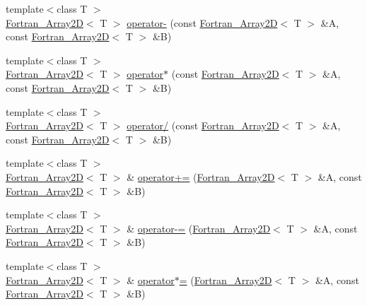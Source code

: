 \begin{DoxyCompactItemize}
{\footnotesize template$<$class T $>$ }\\\hyperlink{classTNT_1_1Fortran__Array2D}{Fortran\+\_\+\+Array2D}$<$ T $>$ \hyperlink{namespaceTNT_a556e2242e5f6a09cc7240a3d544a0149}{operator-\/} (const \hyperlink{classTNT_1_1Fortran__Array2D}{Fortran\+\_\+\+Array2D}$<$ T $>$ \&A, const \hyperlink{classTNT_1_1Fortran__Array2D}{Fortran\+\_\+\+Array2D}$<$ T $>$ \&B)
\item 
{\footnotesize template$<$class T $>$ }\\\hyperlink{classTNT_1_1Fortran__Array2D}{Fortran\+\_\+\+Array2D}$<$ T $>$ \hyperlink{namespaceTNT_a8a02ca89f6e9ca34b3061f20d4d36458}{operator$\ast$} (const \hyperlink{classTNT_1_1Fortran__Array2D}{Fortran\+\_\+\+Array2D}$<$ T $>$ \&A, const \hyperlink{classTNT_1_1Fortran__Array2D}{Fortran\+\_\+\+Array2D}$<$ T $>$ \&B)
\item 
{\footnotesize template$<$class T $>$ }\\\hyperlink{classTNT_1_1Fortran__Array2D}{Fortran\+\_\+\+Array2D}$<$ T $>$ \hyperlink{namespaceTNT_adab9ec5a320edda78d7c70db1962b53c}{operator/} (const \hyperlink{classTNT_1_1Fortran__Array2D}{Fortran\+\_\+\+Array2D}$<$ T $>$ \&A, const \hyperlink{classTNT_1_1Fortran__Array2D}{Fortran\+\_\+\+Array2D}$<$ T $>$ \&B)
\item 
{\footnotesize template$<$class T $>$ }\\\hyperlink{classTNT_1_1Fortran__Array2D}{Fortran\+\_\+\+Array2D}$<$ T $>$ \& \hyperlink{namespaceTNT_abf1054e1d50ab544cfb84d53598c4099}{operator+=} (\hyperlink{classTNT_1_1Fortran__Array2D}{Fortran\+\_\+\+Array2D}$<$ T $>$ \&A, const \hyperlink{classTNT_1_1Fortran__Array2D}{Fortran\+\_\+\+Array2D}$<$ T $>$ \&B)
\item 
{\footnotesize template$<$class T $>$ }\\\hyperlink{classTNT_1_1Fortran__Array2D}{Fortran\+\_\+\+Array2D}$<$ T $>$ \& \hyperlink{namespaceTNT_af6150ea38afd7644250d5cf739462af0}{operator-\/=} (\hyperlink{classTNT_1_1Fortran__Array2D}{Fortran\+\_\+\+Array2D}$<$ T $>$ \&A, const \hyperlink{classTNT_1_1Fortran__Array2D}{Fortran\+\_\+\+Array2D}$<$ T $>$ \&B)
\item 
{\footnotesize template$<$class T $>$ }\\\hyperlink{classTNT_1_1Fortran__Array2D}{Fortran\+\_\+\+Array2D}$<$ T $>$ \& \hyperlink{namespaceTNT_a383a5db478d4a5d28169b06dfe3bbd96}{operator$\ast$=} (\hyperlink{classTNT_1_1Fortran__Array2D}{Fortran\+\_\+\+Array2D}$<$ T $>$ \&A, const \hyperlink{classTNT_1_1Fortran__Array2D}{Fortran\+\_\+\+Array2D}$<$ T $>$ \&B)

\end{DoxyCompactItemize}
